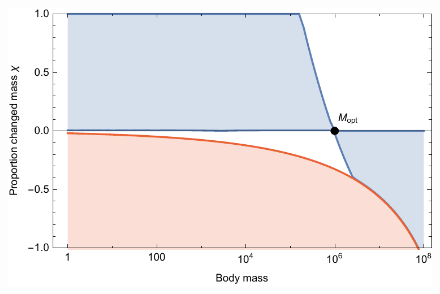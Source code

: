 \documentclass{pnastwo}
\begin{document}
\begin{figure}
\centering
\includegraphics[width=1\textwidth]{fig_Invasion.pdf}
\caption{ %
}
\label{fig:invasion}
\end{figure}  
 

% 
% 
%	 
%
%
%
%
%	 
% 
%	
%
\clearpage
\end{document}
